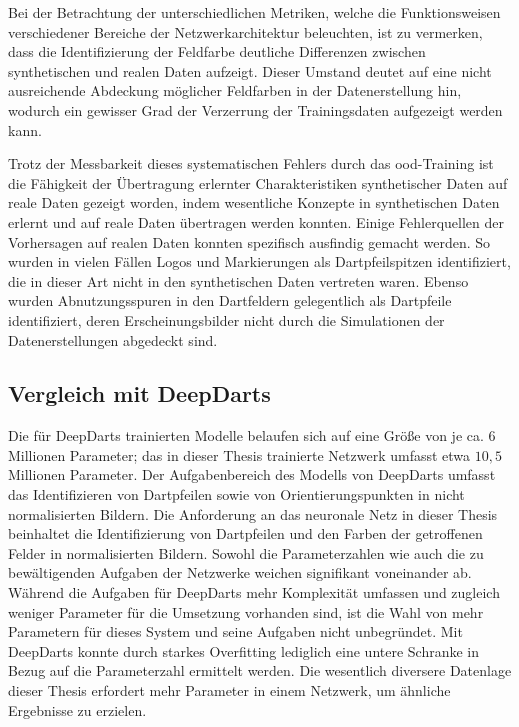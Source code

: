 Bei der Betrachtung der unterschiedlichen Metriken, welche die Funktionsweisen verschiedener Bereiche der Netzwerkarchitektur beleuchten, ist zu vermerken, dass die Identifizierung der Feldfarbe deutliche Differenzen zwischen synthetischen und realen Daten aufzeigt. Dieser Umstand deutet auf eine nicht ausreichende Abdeckung möglicher Feldfarben in der Datenerstellung hin, wodurch ein gewisser Grad der Verzerrung der Trainingsdaten aufgezeigt werden kann.

Trotz der Messbarkeit dieses systematischen Fehlers durch das \ac{ood}-Training ist die Fähigkeit der Übertragung erlernter Charakteristiken synthetischer Daten auf reale Daten gezeigt worden, indem wesentliche Konzepte in synthetischen Daten erlernt und auf reale Daten übertragen werden konnten. Einige Fehlerquellen der Vorhersagen auf realen Daten konnten spezifisch ausfindig gemacht werden. So wurden in vielen Fällen Logos und Markierungen als Dartpfeilspitzen identifiziert, die in dieser Art nicht in den synthetischen Daten vertreten waren. Ebenso wurden Abnutzungsspuren in den Dartfeldern gelegentlich als Dartpfeile identifiziert, deren Erscheinungsbilder nicht durch die Simulationen der Datenerstellungen abgedeckt sind.


\vspace*{-0.1cm}
\subsection{Vergleich mit DeepDarts}

Die für DeepDarts trainierten Modelle belaufen sich auf eine Größe von je ca. $6$ Millionen Parameter; das in dieser Thesis trainierte Netzwerk umfasst etwa $10,\!5$ Millionen Parameter. Der Aufgabenbereich des Modells von DeepDarts umfasst das Identifizieren von Dartpfeilen sowie von Orientierungspunkten in nicht normalisierten Bildern. Die Anforderung an das neuronale Netz in dieser Thesis beinhaltet die Identifizierung von Dartpfeilen und den Farben der getroffenen Felder in normalisierten Bildern. Sowohl die Parameterzahlen wie auch die zu bewältigenden Aufgaben der Netzwerke weichen signifikant voneinander ab. Während die Aufgaben für DeepDarts mehr Komplexität umfassen und zugleich weniger Parameter für die Umsetzung vorhanden sind, ist die Wahl von mehr Parametern für dieses System und seine Aufgaben nicht unbegründet. Mit DeepDarts konnte durch starkes Overfitting lediglich eine untere Schranke in Bezug auf die Parameterzahl ermittelt werden. Die wesentlich diversere Datenlage dieser Thesis erfordert mehr Parameter in einem Netzwerk, um ähnliche Ergebnisse zu erzielen.

